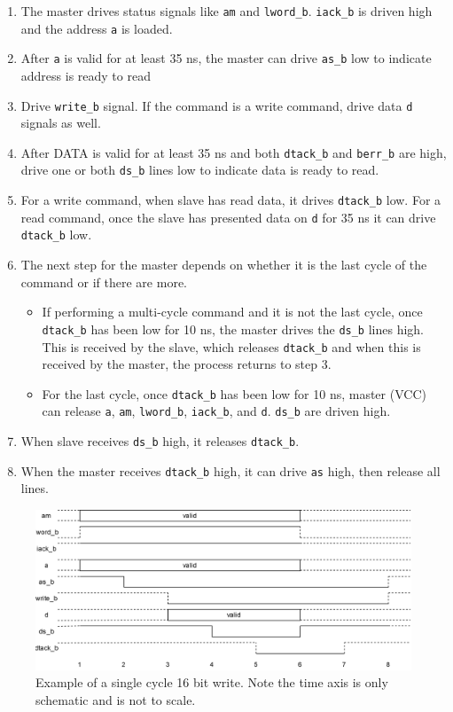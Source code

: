 \documentclass[10pt,a4paper]{article}
\begin{document}
\begin{enumerate}
\item The master drives status signals like \texttt{am} and \texttt{lword\_b}. \texttt{iack\_b} is driven high and the address \texttt{a} is loaded. 
\item After \texttt{a} is valid for at least 35 ns, the master can drive \texttt{as\_b} low to indicate address is ready to read
\item Drive \texttt{write\_b} signal. If the command is a write command, drive data \texttt{d} signals as well.
\item After DATA is valid for at least 35 ns and both \texttt{dtack\_b} and \texttt{berr\_b} are high, drive one or both \texttt{ds\_b} lines low to indicate data is ready to read.
\item For a write command, when slave has read data, it drives \texttt{dtack\_b} low. For a read command, once the slave has presented data on \texttt{d} for 35 ns it can drive \texttt{dtack\_b} low.
\item The next step for the master depends on whether it is the last cycle of the command or if there are more.
\begin{itemize}
\item If performing a multi-cycle command and it is not the last cycle, once \texttt{dtack\_b} has been low for 10 ns, the master drives the \texttt{ds\_b} lines high. This is received by the slave, which
 releases \texttt{dtack\_b} and when this is received by the master, the process returns to step 3.
\item For the last cycle, once \texttt{dtack\_b} has been low for 10 ns, master (VCC) can release \texttt{a}, \texttt{am}, \texttt{lword\_b}, \texttt{iack\_b}, and \texttt{d}. \texttt{ds\_b} are driven  high.
\end{itemize}
\item When slave receives \texttt{ds\_b} high, it releases \texttt{dtack\_b}. 
\item When the master receives \texttt{dtack\_b} high, it can drive \texttt{as} high, then release all lines.
\end{enumerate}

\begin{figure}[H]
\centering
\includegraphics[width= 0.8 \textwidth]{figures/vmeprotocol.png}
\caption{Example of a single cycle 16 bit write. Note the time axis is only schematic and is not to scale.}
\label{fig:vmewrite}
\end{figure}
\end{document}
